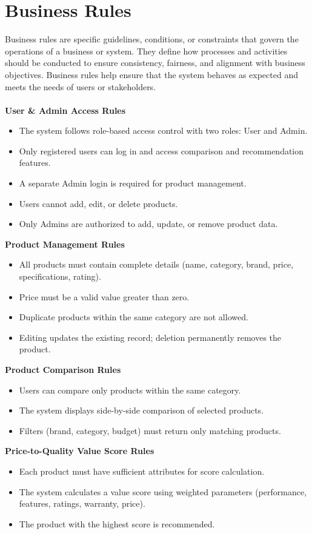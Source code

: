 \section{Business Rules}
Business rules are specific guidelines, conditions, or constraints that govern the operations of a
business or system. They define how processes and activities should be conducted to ensure
consistency, fairness, and alignment with business objectives. Business rules help ensure that the
system behaves as expected and meets the needs of users or stakeholders.\\\\
\textbf{User \& Admin Access Rules}
\begin{itemize}
    \item The system follows role-based access control with two roles: User and Admin.
    \item Only registered users can log in and access comparison and recommendation features.
    \item A separate Admin login is required for product management.
    \item Users cannot add, edit, or delete products.
    \item Only Admins are authorized to add, update, or remove product data.
\end{itemize}
\textbf{Product Management Rules}
\begin{itemize}
    \item All products must contain complete details (name, category, brand, price, specifications, rating).
    \item Price must be a valid value greater than zero.
    \item Duplicate products within the same category are not allowed.
    \item Editing updates the existing record; deletion permanently removes the product.
\end{itemize}
\textbf{Product Comparison Rules}
\begin{itemize}
    \item Users can compare only products within the same category.
    \item The system displays side-by-side comparison of selected products.
    \item Filters (brand, category, budget) must return only matching products.
\end{itemize}
\textbf{Price-to-Quality Value Score Rules}
\begin{itemize}
    \item Each product must have sufficient attributes for score calculation.
    \item The system calculates a value score using weighted parameters (performance, features, ratings, warranty, price).
    \item The product with the highest score is recommended.
\end{itemize}


